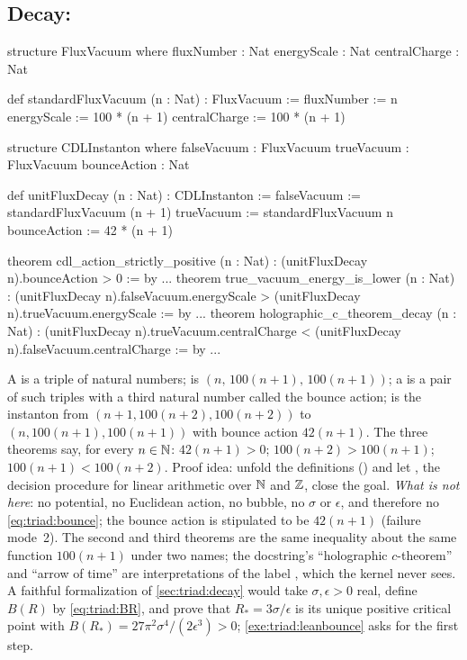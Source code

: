 \subsection{Decay: }

\begin{leancode}
structure FluxVacuum where
  fluxNumber : Nat
  energyScale : Nat
  centralCharge : Nat

def standardFluxVacuum (n : Nat) : FluxVacuum := {
  fluxNumber := n
  energyScale := 100 * (n + 1)
  centralCharge := 100 * (n + 1)
}

structure CDLInstanton where
  falseVacuum : FluxVacuum
  trueVacuum : FluxVacuum
  bounceAction : Nat

def unitFluxDecay (n : Nat) : CDLInstanton := {
  falseVacuum := standardFluxVacuum (n + 1)
  trueVacuum := standardFluxVacuum n
  bounceAction := 42 * (n + 1)
}

theorem cdl_action_strictly_positive (n : Nat) :
    (unitFluxDecay n).bounceAction > 0 := by ...
theorem true_vacuum_energy_is_lower (n : Nat) :
    (unitFluxDecay n).falseVacuum.energyScale
      > (unitFluxDecay n).trueVacuum.energyScale := by ...
theorem holographic_c_theorem_decay (n : Nat) :
    (unitFluxDecay n).trueVacuum.centralCharge
      < (unitFluxDecay n).falseVacuum.centralCharge := by ...
\end{leancode}
\begin{leanbox}
A  is a triple of natural numbers;  is
$(n,\,100(n+1),\,100(n+1))$; a  is a pair of such triples with a third
natural number called the bounce action;  is the instanton from
$(n+1,100(n+2),100(n+2))$ to $(n,100(n+1),100(n+1))$ with bounce action $42(n+1)$. The three
theorems say, for every $n\in\mathbb{N}$: $42(n+1)>0$; $100(n+2)>100(n+1)$; $100(n+1)<100(n+2)$. Proof
idea: unfold the definitions () and let , the decision procedure for
linear arithmetic over $\mathbb{N}$ and $\mathbb{Z}$, close the goal. \emph{What is not here}: no potential, no
Euclidean action, no bubble, no $\sigma$ or $\epsilon$, and therefore no
\eqref{eq:triad:bounce}; the bounce action is stipulated to be $42(n+1)$ (failure mode~2). The
second and third theorems are the same inequality about the same function $100(n+1)$ under two
names; the docstring's ``holographic $c$-theorem'' and ``arrow of time'' are interpretations
of the label , which the kernel never sees. A faithful formalization of
\cref{sec:triad:decay} would take $\sigma,\epsilon>0$ real, define $B(R)$ by
\eqref{eq:triad:BR}, and prove that $R_*=3\sigma/\epsilon$ is its unique positive critical
point with $B(R_*)=27\pi^2\sigma^4/(2\epsilon^3)>0$; \cref{exe:triad:leanbounce} asks for the
first step.
\end{leanbox}


